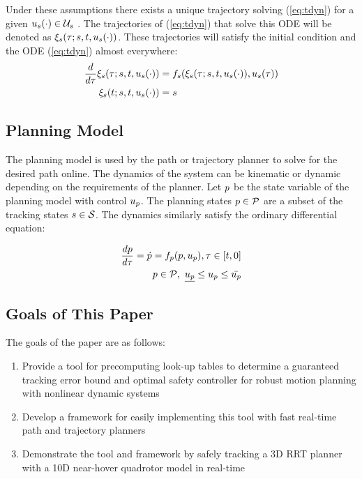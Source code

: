 Under these assumptions there exists a unique trajectory solving (\ref{eq:tdyn}) for a given $u_s(\cdot) \in \mathcal{U}_s$ \cite{Coddington84}. The trajectories of (\ref{eq:tdyn}) that solve this ODE will be denoted as $\xi_{s}(\tau; s, t, u_s(\cdot))$. These trajectories will satisfy the initial condition and the ODE (\ref{eq:tdyn}) almost everywhere:
\begin{equation}
\label{eq:fdyn_traj}
\begin{aligned}
\frac{d}{d\tau}\xi_{s}(\tau; s, t, u_s(\cdot)) &= f_s(\xi_{s}(\tau; s, t, u_s(\cdot)), u_s(\tau)) \\
\xi_{s}(t; s, t, u_s(\cdot)) &= s
\end{aligned}
\end{equation}

\subsection{Planning Model}
The planning model is used by the path or trajectory planner to solve for the desired path online. The dynamics of the system can be kinematic or dynamic depending on the requirements of the planner. Let $p$ be the state variable of the planning model with control $u_p$. The planning states $p \in \mathcal{P}$ are a subset of the tracking states $s \in \mathcal{S}$. The dynamics similarly satisfy the ordinary differential equation:

\begin{equation}
\begin{aligned}
\label{eq:pdyn}
\frac{dp}{d\tau} = \dot{p} = f_p(p, u_p), \tau \in [t, 0] \\
p \in \mathcal{P}, \ \underline{u_p} \leq u_p \leq \bar{u_p}
\end{aligned}
\end{equation}

\subsection{Goals of This Paper}
The goals of the paper are as follows:
\begin{enumerate}
	\item Provide a tool for precomputing look-up tables to determine a guaranteed tracking error bound and optimal safety controller for robust motion planning with nonlinear dynamic systems
	\item Develop a framework for easily implementing this tool with fast real-time path and trajectory planners
	\item Demonstrate the tool and framework by safely tracking a 3D RRT planner with a 10D near-hover quadrotor model in real-time
\end{enumerate}
